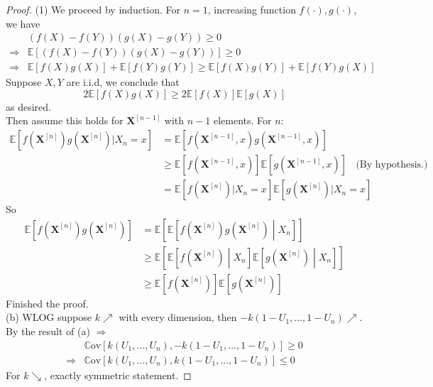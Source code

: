 \documentclass[a4paper, 10pt]{article}
\theoremstyle{definition}
\theoremstyle{hSol}
\begin{document}
\begin{proof} (1) We proceed by induction. For $n=1$, increasing function $f(\cdot), g(\cdot)$, we have
\begin{equation}
  \begin{split}
    & (f(X)-f(Y))(g(X)-g(Y)) \geq 0 \\
    \Rightarrow & \mathbb{E}\left[(f(X)-f(Y))(g(X)-g(Y))\right] \geq 0\\
    \Rightarrow & \mathbb{E}\left[f(X)g(X)\right] + \mathbb{E}\left[f(Y)g(Y)\right] \geq \mathbb{E}\left[f(X)g(Y)\right] + \mathbb{E}\left[f(Y)g(X)\right]
  \end{split}
\end{equation}
Suppose $X, Y$ are i.i.d, we conclude that
\begin{equation}
  2\mathbb{E}\left[f(X)g(X)\right] \geq 2\mathbb{E}\left[f(X)\right]\mathbb{E}\left[g(X)\right]
\end{equation}
as desired. \\
Then assume this holds for $\bm{X}^{[n-1]}$ with $n-1$ elements. For $n$:
\begin{equation}
  \begin{split}
    \mathbb{E}\left[f(\bm{X}^{[n]})g(\bm{X}^{[n]})|X_n=x\right] &= \mathbb{E}\left[f(\bm{X}^{[n-1]},x)g(\bm{X}^{[n-1]},x)\right] \\
    &\geq \mathbb{E}\left[f(\bm{X}^{[n-1]},x)\right]\mathbb{E}\left[g(\bm{X}^{[n-1]},x)\right]~~~~\text{(By hypothesis.)}\\
    &= \mathbb{E}\left[f(\bm{X}^{[n]})|X_n=x\right]\mathbb{E}\left[g(\bm{X}^{[n]})|X_n=x\right]
  \end{split}
\end{equation}
So
\begin{equation}
  \begin{split}
    \mathbb{E}\left[f(\bm{X}^{[n]})g(\bm{X}^{[n]})\right] &= \mathbb{E}\left[\mathbb{E}\left[f(\bm{X}^{[n]})g(\bm{X}^{[n]})\middle|X_n\right]\right] \\
    &\geq \mathbb{E}\left[\mathbb{E}\left[f(\bm{X}^{[n]})\middle|X_n\right]\mathbb{E}\left[g(\bm{X}^{[n]})\middle|X_n\right]\right] \\
    &\geq \mathbb{E}\left[f(\bm{X}^{[n]})\right]\mathbb{E}\left[g(\bm{X}^{[n]})\right]
  \end{split}
\end{equation}
Finished the proof. \\
(b) WLOG suppose $k\nearrow$ with every dimension, then $-k(1-U_1, ..., 1-U_n)\nearrow$. By the result of (a) $\Rightarrow$
\begin{equation}
  \begin{split}
    & \mathrm{\mathbb{C}ov}\left[k(U_1, ..., U_n), -k(1-U_1, ..., 1-U_n)\right] \geq 0\\
    \Rightarrow & \mathrm{\mathbb{C}ov}\left[k(U_1, ..., U_n), k(1-U_1, ..., 1-U_n)\right] \leq 0
  \end{split}
\end{equation}
For $k\searrow$, exactly symmetric statement.
\end{proof}
\end{document}
